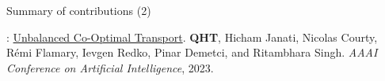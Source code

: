 \documentclass{beamer}
\begin{document}
\begin{frame}{Summary of contributions (2)}
  \scriptsize

  \vspace{-4cm}
  {}: \ul{Unbalanced Co-Optimal Transport}.
  \textbf{QHT}, Hicham Janati, Nicolas Courty, Rémi Flamary, Ievgen Redko,
  Pinar Demetci, and Ritambhara Singh.
  \textit{AAAI Conference on Artificial Intelligence}, 2023.

\end{frame}
\end{document}
